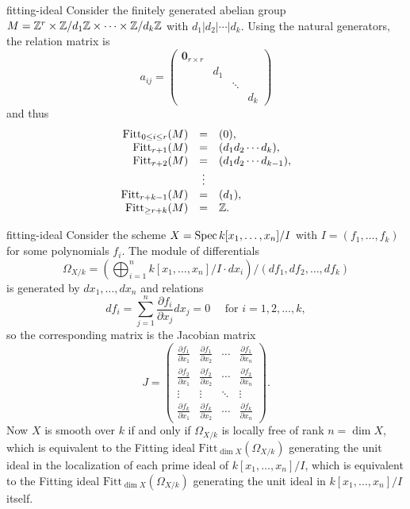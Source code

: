 \begin{example}{fitting-ideal}
    Consider the finitely generated abelian group $M = \mathbb{Z}^r \times \mathbb{Z} / d_1 \mathbb{Z} \times \cdots \times \mathbb{Z} / d_k \mathbb{Z}$ with $d_1 | d_2 | \cdots | d_k$. Using the natural generators, the relation matrix is
    \[ a_{ij} = \begin{pmatrix} \textbf{0}_{r \times r} & & &  \\  & d_1 & \\ & & \ddots & \\ & & & d_k \end{pmatrix} \]
    and thus
    \[ \begin{array}{rcl}
         \text{Fitt}_{0 \le i \le r}(M) &=& (0) , \\
        \text{Fitt}_{r + 1}(M) &=& (d_1 d_2\cdots d_k) , \\
        \text{Fitt}_{r + 2}(M) &=& (d_1 d_2\cdots d_{k - 1}) , \\
        & \vdots & \\
        \text{Fitt}_{r + k - 1}(M) &=& (d_1) , \\
        \text{Fitt}_{\ge r + k}(M) &=& \mathbb{Z} .
    \end{array} \]
\end{example}

\begin{example}{fitting-ideal}
    Consider the scheme $X = \operatorname{Spec} k[x_1, \ldots, x_n] / I$ with $I = (f_1, \ldots, f_k)$ for some polynomials $f_i$. The module of differentials
    \[ \Omega_{X/k} = \left(\bigoplus_{i = 1}^{n} k[x_1, \ldots, x_n] / I \cdot dx_i \right) / (df_1, df_2, \ldots, df_k) \]
    is generated by $dx_1, \ldots, dx_n$ and relations
    \[ df_i = \sum_{j = 1}^{n} \frac{\partial f_i}{\partial x_j} dx_j = 0 \quad \text{ for } i = 1, 2, \ldots, k , \]
    so the corresponding matrix is the Jacobian matrix
    \[ J = \begin{pmatrix}
        \frac{\partial f_1}{\partial x_1} & \frac{\partial f_1}{\partial x_2} & \cdots & \frac{\partial f_1}{\partial x_n} \\
        \frac{\partial f_2}{\partial x_1} & \frac{\partial f_2}{\partial x_2} & \cdots & \frac{\partial f_2}{\partial x_n} \\
        \vdots & \vdots & \ddots & \vdots \\
        \frac{\partial f_k}{\partial x_1} & \frac{\partial f_k}{\partial x_2} & \cdots & \frac{\partial f_k}{\partial x_n}
    \end{pmatrix} . \]
    Now $X$ is smooth over $k$ if and only if $\Omega_{X/k}$ is locally free of rank $n = \dim X$, which is equivalent to the Fitting ideal $\text{Fitt}_{\dim X}(\Omega_{X/k})$ generating the unit ideal in the localization of each prime ideal of $k[x_1, \ldots, x_n] / I$, which is equivalent to the Fitting ideal $\text{Fitt}_{\dim X}(\Omega_{X/k})$ generating the unit ideal in $k[x_1, \ldots, x_n] / I$ itself.
\end{example}

